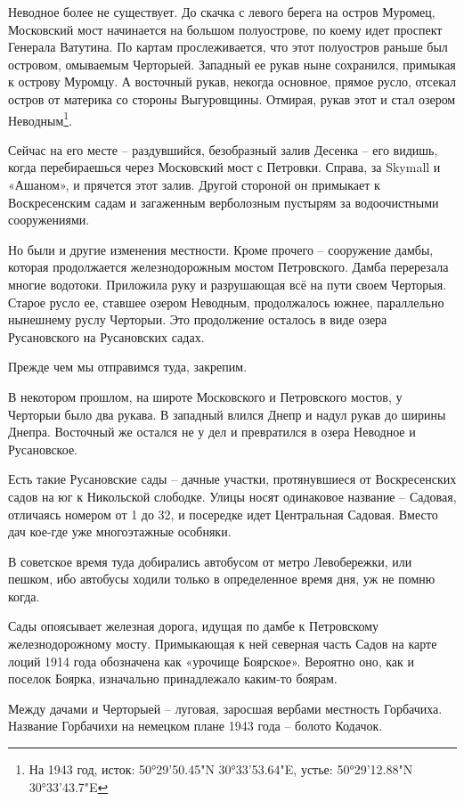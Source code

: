 Неводное более не существует. До скачка с левого берега на остров Муромец, Московский мост начинается на большом полуострове, по коему идет проспект Генерала Ватутина. По картам прослеживается, что этот полуостров раньше был островом, омываемым Черторыей. Западный ее рукав ныне сохранился, примыкая к острову Муромцу. А восточный рукав, некогда основное, прямое русло, отсекал остров от материка со стороны Выгуровщины. Отмирая, рукав этот и стал озером Неводным\footnote{На 1943 год, исток: 50°29'50.45"N 30°33'53.64"E, устье: 50°29'12.88"N  30°33'43.7"E}. 

Сейчас на его месте – раздувшийся, безобразный залив Десенка – его видишь, когда перебираешься через Московский мост с Петровки. Справа, за Skymall и «Ашаном», и прячется этот залив. Другой стороной он примыкает к Воскресенским садам и загаженным верболозным пустырям за водоочистными сооружениями.

Но были и другие изменения местности. Кроме прочего – сооружение дамбы, которая продолжается железнодорожным мостом Петровского. Дамба перерезала многие водотоки. Приложила руку и разрушающая всё на пути своем Черторыя. Старое русло ее, ставшее озером Неводным, продолжалось южнее, параллельно нынешнему руслу Черторыи. Это продолжение осталось в виде озера Русановского на Русановских садах.

Прежде чем мы отправимся туда, закрепим.

В некотором прошлом, на широте Московского и Петровского мостов, у Черторыи было два рукава. В западный влился Днепр и надул рукав до ширины Днепра. Восточный же остался не у дел и превратился в озера Неводное и Русановское.
  
Есть такие Русановские сады – дачные участки, протянувшиеся от Воскресенских садов на юг к Никольской слободке. Улицы носят одинаковое название – Садовая, отличаясь номером от 1 до 32, и посередке идет Центральная Садовая. Вместо дач кое-где уже многоэтажные особняки.

В советское время туда добирались автобусом от метро Левобережки, или пешком, ибо автобусы ходили только в определенное время дня, уж не помню когда.

Сады опоясывает железная дорога, идущая по дамбе к Петровскому железнодорожному мосту. Примыкающая к ней северная часть Садов на карте лоций 1914 года обозначена как «урочище Боярское». Вероятно оно, как и поселок Боярка, изначально принадлежало каким-то боярам.

Между дачами и Черторыей – луговая, заросшая вербами местность Горбачиха. Название Горбачихи на нем\-ецком плане 1943 года – болото Кодачок.

